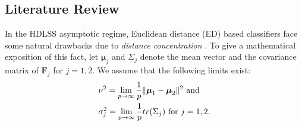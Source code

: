 \documentclass[twoside]{article}
\newcommand{\bF}{\mathbf{F}}
\newcommand{\bmu}{\boldsymbol{\mu}}
\newcommand{\0}{\mathbf{0}}
\newcommand{\1}{\mathbf{1}}
\numberwithin{equation}{section}
\begin{document}
\subsection{Literature Review}
In the HDLSS asymptotic regime, Euclidean distance (ED) based classifiers face some natural drawbacks due to \emph{distance concentration} \citep{aggarwal2001surprising,francois2007concentration}. To give a mathematical exposition of this fact, let $\bmu_j$ and $\Sigma_j$ denote the mean vector and the covariance matrix of $\bF_j$ for $j=1,2$. We assume that the following limits exist:
\vspace{-0.15cm}
\begin{align}\label{limconst1}
\small
& \nu^2 = \lim\limits_{p\to\infty}\frac{1}{p}\|\bmu_1-\bmu_2\|^2\text{ and }\nonumber\\
& \sigma_j^2 = \lim\limits_{p\to\infty}\frac{1}{p} tr  (\Sigma_j)\text{ for }  j= 1,2.
\end{align}
\end{document}
